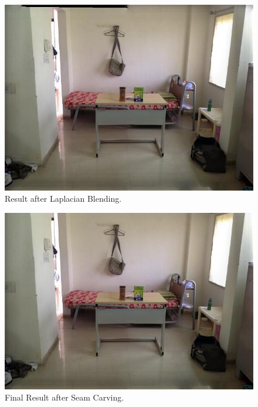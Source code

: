 \documentclass[conference]{IEEEtran}
\begin{document}
\begin{figure}
  \includegraphics[width=\linewidth]{ab.jpg}
  \caption{Result after Laplacian Blending.}
  \label{fig:i6}
\end{figure}
\begin{figure}
  \includegraphics[width=\linewidth]{result.jpg}
  \caption{Final Result after Seam Carving.}
  \label{fig:i7}
\end{figure}
\end{document}

